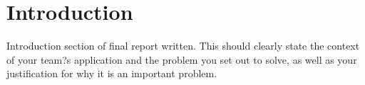 \section{Introduction}
\label{sec:Intro}
Introduction section of final report written.
This should clearly state the context of your team?s application and the problem you set out to solve, as well as your justification for why it is an important problem.
